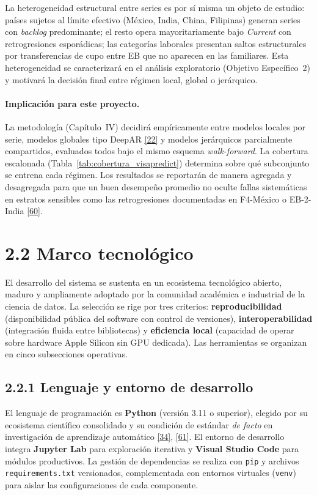 \documentclass[12pt,letterpaper]{report}
\newcommand{\cita}[1]{\hyperref[bib:#1]{[#1]}}
\begin{document}
La heterogeneidad estructural entre series es por sí misma un objeto de estudio: países sujetos al límite efectivo (México, India, China, Filipinas) generan series con \textit{backlog} predominante; el resto opera mayoritariamente bajo \textit{Current} con retrogresiones esporádicas; las categorías laborales presentan saltos estructurales por transferencias de cupo entre EB que no aparecen en las familiares. Esta heterogeneidad se caracterizará en el análisis exploratorio (Objetivo Específico~2) y motivará la decisión final entre régimen local, global o jerárquico.

\paragraph{Implicación para este proyecto.} La metodología (Capítulo~IV) decidirá empíricamente entre modelos locales por serie, modelos globales tipo DeepAR \cita{22} y modelos jerárquicos parcialmente compartidos, evaluados todos bajo el mismo esquema \textit{walk-forward}. La cobertura escalonada (Tabla~\ref{tab:cobertura_visapredict}) determina sobre qué subconjunto se entrena cada régimen. Los resultados se reportarán de manera agregada y desagregada para que un buen desempeño promedio no oculte fallas sistemáticas en estratos sensibles como las retrogresiones documentadas en F4-México o EB-2-India \cita{60}.

\section{2.2 Marco tecnológico}

El desarrollo del sistema se sustenta en un ecosistema tecnológico abierto, maduro y ampliamente adoptado por la comunidad académica e industrial de la ciencia de datos. La selección se rige por tres criterios: \textbf{reproducibilidad} (disponibilidad pública del software con control de versiones), \textbf{interoperabilidad} (integración fluida entre bibliotecas) y \textbf{eficiencia local} (capacidad de operar sobre hardware Apple Silicon sin GPU dedicada). Las herramientas se organizan en cinco subsecciones operativas.

\subsection{2.2.1 Lenguaje y entorno de desarrollo}

El lenguaje de programación es \textbf{Python} (versión 3.11 o superior), elegido por su ecosistema científico consolidado y su condición de estándar \textit{de facto} en investigación de aprendizaje automático \cita{34}, \cita{61}. El entorno de desarrollo integra \textbf{Jupyter Lab} para exploración iterativa y \textbf{Visual Studio Code} para módulos productivos. La gestión de dependencias se realiza con \texttt{pip} y archivos \texttt{requirements.txt} versionados, complementada con entornos virtuales (\texttt{venv}) para aislar las configuraciones de cada componente.
\end{document}
